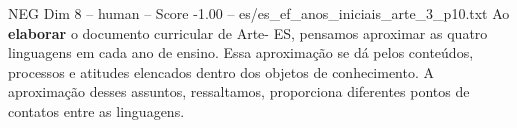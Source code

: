 \begin{textsample}{NEG Dim 8 – human – Score -1.00 – es/es\_ef\_anos\_iniciais\_arte\_3\_p10.txt}  \label{ex:f8_neg_020}
Ao \textbf{elaborar} o documento curricular de Arte- ES, pensamos aproximar as quatro linguagens em cada ano de ensino.
Essa aproximação se dá pelos conteúdos, processos e atitudes elencados dentro dos objetos de conhecimento.
A aproximação desses assuntos, ressaltamos, proporciona diferentes pontos de contatos entre as linguagens.

\end{textsample}
